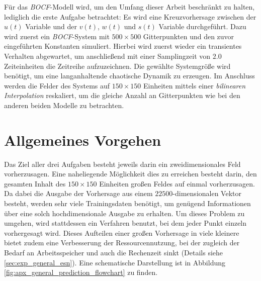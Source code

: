 Für das \textit{BOCF}-Modell wird, um den Umfang dieser Arbeit beschränkt zu halten, lediglich die erste Aufgabe betrachtet: Es wird eine Kreuzvorhersage zwischen der $u(t)$ Variable und der $v(t)$, $w(t)$ und $s(t)$ Variable durchgeführt. Dazu wird zuerst ein \textit{BOCF}-System mit $500 \times 500$ Gitterpunkten und den zuvor eingeführten Konstanten simuliert. Hierbei wird zuerst wieder ein transientes Verhalten abgewartet, um anschließend mit einer Samplingzeit von $2.0$ Zeiteinheiten die Zeitreihe aufzuzeichnen. Die gewählte Systemgröße wird benötigt, um eine langanhaltende chaotische Dynamik zu erzeugen. Im Anschluss werden die Felder des Systems auf $150 \times 150$ Einheiten mittels einer \textit{bilinearen Interpolation} reskaliert, um die gleiche Anzahl an Gitterpunkten wie bei den anderen beiden Modelle zu betrachten. 

\section{Allgemeines Vorgehen}
\label{sc:experiments_general}
Das Ziel aller drei Aufgaben besteht jeweils darin ein zweidimensionales Feld vorherzusagen. Eine naheliegende Möglichkeit dies zu erreichen besteht darin, den gesamten Inhalt des $150 \times 150$ Einheiten großen Feldes auf einmal vorherzusagen. Da dabei die Ausgabe der Vorhersage aus einem $22500$-dimensionalen Vektor besteht, werden sehr viele Trainingsdaten benötigt, um genügend Informationen über eine solch hochdimensionale Ausgabe zu erhalten. Um dieses Problem zu umgehen, wird stattdessen ein Verfahren benutzt, bei dem jeder Punkt einzeln vorhergesagt wird. Dieses Aufteilen einer großen Vorhersage in viele kleinere bietet zudem eine Verbesserung der Ressourcennutzung, bei der zugleich der Bedarf an Arbeitsspeicher und auch die Rechenzeit sinkt (Details siehe \ref{sec:exp_general_esn}). Eine schematische Darstellung ist in Abbildung \ref{fig:apx_general_prediction_flowchart} zu finden.\\

